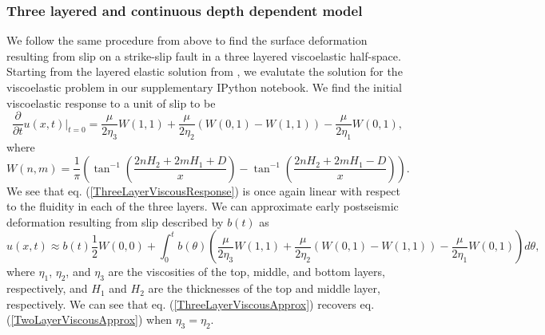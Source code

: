 \documentclass[extra,mreferee]{gji}
\begin{document}
\subsubsection{Three layered and continuous depth dependent model}
We follow the same procedure from above to find the surface
deformation resulting from slip on a strike-slip fault in a three
layered viscoelastic half-space.  Starting from the layered elastic
solution from \citet{CJ1972}, we evalutate the solution for the
viscoelastic problem in our supplementary IPython notebook.  We find
the initial viscoelastic response to a unit of slip to be
\begin{equation}\label{ThreeLayerViscousResponse}
\frac{\partial}{\partial t}u(x,t)\big|_{t=0} = \frac{\mu}{2\eta_3}W(1,1)
                                      +\frac{\mu}{2\eta_2}(W(0,1) - W(1,1))
                                      -\frac{\mu}{2\eta_1}W(0,1),
\end{equation}
where
\begin{equation}
  W(n,m) = \frac{1}{\pi}\left(\tan^{-1}\left(\frac{2nH_2 + 2mH_1 + D}{x}\right) - 
                              \tan^{-1}\left(\frac{2nH_2 + 2mH_1 - D}{x}\right)\right).
\end{equation}
We see that eq. (\ref{ThreeLayerViscousResponse}) is once again linear
with respect to the fluidity in each of the three layers.  We can
approximate early postseismic deformation resulting from slip
described by $b(t)$ as
\begin{equation}\label{ThreeLayerViscousApprox}
u(x,t) \approx b(t)\frac{1}{2} W(0,0) + 
         \int_0^tb(\theta)\left(\frac{\mu}{2\eta_3}W(1,1)
                               +\frac{\mu}{2\eta_2}(W(0,1) - W(1,1))
                               -\frac{\mu}{2\eta_1}W(0,1)\right)d\theta,
\end{equation}
where $\eta_1$, $\eta_2$, and $\eta_3$ are the viscosities of the top,
middle, and bottom layers, respectively, and $H_1$ and $H_2$ are the
thicknesses of the top and middle layer, respectively.  We can see
that eq. (\ref{ThreeLayerViscousApprox}) recovers eq.
(\ref{TwoLayerViscousApprox}) when $\eta_3 = \eta_2$.
\end{document}
